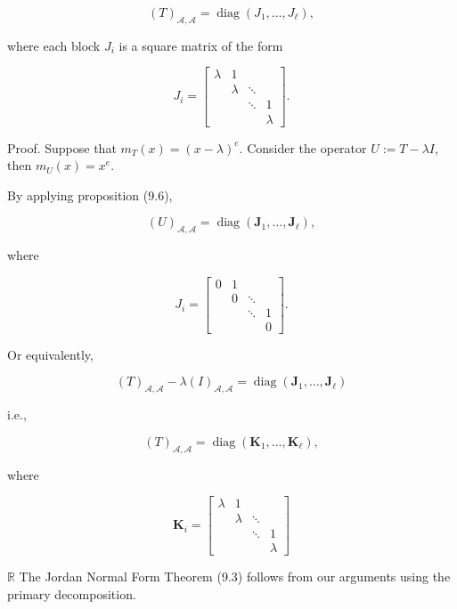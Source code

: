\documentclass[11pt]{article}
\begin{document}
\[
{\left( T\right) }_{\mathcal{A},\mathcal{A}} = \operatorname{diag}\left( {{J}_1,\ldots ,{J}_{\ell }}\right) ,
\]

where each block \({J}_{i}\) is a square matrix of the form

\[
{J}_{i} = \left\lbrack  \begin{matrix} \lambda & 1 & & \\   & \lambda &  \ddots  & \\   & &  \ddots  & 1 \\   & & & \lambda  \end{matrix}\right\rbrack  .
\]

Proof. Suppose that \({m}_{T}\left( x\right)  = {\left( x - \lambda \right) }^{e}\). Consider the operator \(U \mathrel{\text{ := }} T - {\lambda I}\), then \({m}_{U}\left( x\right)  = {x}^{e}\).

By applying proposition (9.6),

\[
{\left( U\right) }_{\mathcal{A},\mathcal{A}} = \operatorname{diag}\left( {{\mathbf{J}}_1,\ldots ,{\mathbf{J}}_{\ell }}\right) ,
\]

where

\[
{J}_{i} = \left\lbrack  \begin{matrix} 0 & 1 & & \\   & 0 &  \ddots  & \\   & &  \ddots  & 1 \\   & & & 0 \end{matrix}\right\rbrack  .
\]

Or equivalently,

\[
{\left( T\right) }_{\mathcal{A},\mathcal{A}} - \lambda {\left( I\right) }_{\mathcal{A},\mathcal{A}} = \operatorname{diag}\left( {{\mathbf{J}}_1,\ldots ,{\mathbf{J}}_{\ell }}\right)
\]

i.e.,

\[
{\left( T\right) }_{\mathcal{A},\mathcal{A}} = \operatorname{diag}\left( {{\mathbf{K}}_1,\ldots ,{\mathbf{K}}_{\ell }}\right) ,
\]

where

\[
{\mathbf{K}}_{i} = \left\lbrack  \begin{matrix} \lambda & 1 & & \\   & \lambda &  \ddots  & \\   & &  \ddots  & 1 \\   & & & \lambda  \end{matrix}\right\rbrack
\]

\(\mathbb{R}\) The Jordan Normal Form Theorem (9.3) follows from our arguments using the primary decomposition.
\end{document}
